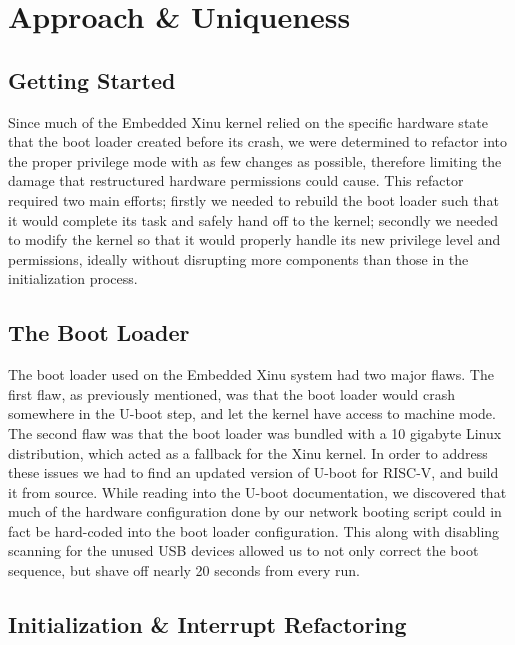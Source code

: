 \section{Approach \& Uniqueness}

\subsection{Getting Started}

Since much of the Embedded Xinu kernel relied on the specific hardware state that the boot loader created before its crash, we were determined to refactor into the proper privilege mode with as few changes as possible, therefore limiting the damage that restructured hardware permissions could cause. This refactor required two main efforts; firstly we needed to rebuild the boot loader such that it would complete its task and safely hand off to the kernel; secondly we needed to modify the kernel so that it would properly handle its new privilege level and permissions, ideally without disrupting more components than those in the initialization process. 

\subsection{The Boot Loader}

The boot loader used on the Embedded Xinu system had two major flaws. The first flaw, as previously mentioned, was that the boot loader would crash somewhere in the U-boot step, and let the kernel have access to machine mode. The second flaw was that the boot loader was bundled with a 10 gigabyte Linux distribution, which acted as a fallback for the Xinu kernel. In order to address these issues we had to find an updated version of U-boot for RISC-V, and build it from source. While reading into the U-boot documentation, we discovered that much of the hardware configuration done by our network booting script could in fact be hard-coded into the boot loader configuration. This along with disabling scanning for the unused USB devices allowed us to not only correct the boot sequence, but shave off nearly 20 seconds from every run.

\subsection{Initialization \& Interrupt Refactoring}


